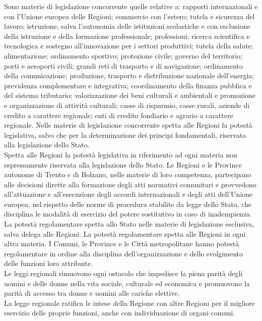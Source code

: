 \documentclass{article}
\begin{document}
Sono materie di legislazione concorrente quelle relative a: rapporti internazionali e con l’Unione europea delle Regioni; commercio con l’estero; tutela e sicurezza del lavoro; istruzione, salva l’autonomia delle istituzioni scolastiche e con esclusione della istruzione e della formazione professionale; professioni; ricerca scientifica e tecnologica e sostegno all’innovazione per i settori produttivi; tutela della salute; alimentazione; ordinamento sportivo; protezione civile; governo del territorio; porti e aeroporti civili; grandi reti di trasporto e di navigazione; ordinamento della comunicazione; produzione, trasporto e distribuzione nazionale dell’energia; previdenza complementare e integrativa; coordinamento della finanza pubblica e del sistema tributario; valorizzazione dei beni culturali e ambientali e promozione e organizzazione di attività culturali; casse di risparmio, casse rurali, aziende di credito a carattere regionale; enti di credito fondiario e agrario a carattere regionale. Nelle materie di legislazione concorrente spetta alle Regioni la potestà legislativa, salvo che per la determinazione dei principi fondamentali, riservata alla legislazione dello Stato.\\
Spetta alle Regioni la potestà legislativa in riferimento ad ogni materia non espressamente riservata alla legislazione dello Stato.
Le Regioni e le Province autonome di Trento e di Bolzano, nelle materie di loro competenza, partecipano alle decisioni dirette alla formazione degli atti normativi comunitari e provvedono all’attuazione e all’esecuzione degli accordi internazionali e degli atti dell’Unione europea, nel rispetto delle norme di procedura stabilite da legge dello Stato, che disciplina le modalità di esercizio del potere sostitutivo in caso di inadempienza.\\
La potestà regolamentare spetta allo Stato nelle materie di legislazione esclusiva, salva delega alle Regioni. La potestà regolamentare spetta alle Regioni in ogni altra materia. I Comuni, le Province e le Città metropolitane hanno potestà regolamentare in ordine alla disciplina dell’organizzazione e dello svolgimento delle funzioni loro attribuite.\\
Le leggi regionali rimuovono ogni ostacolo che impedisce la piena parità degli uomini e delle donne nella vita sociale, culturale ed economica e promuovono la parità di accesso tra donne e uomini alle cariche elettive.\\
La legge regionale ratifica le intese della Regione con altre Regioni per il migliore esercizio delle proprie funzioni, anche con individuazione di organi comuni.\\
\end{document}
